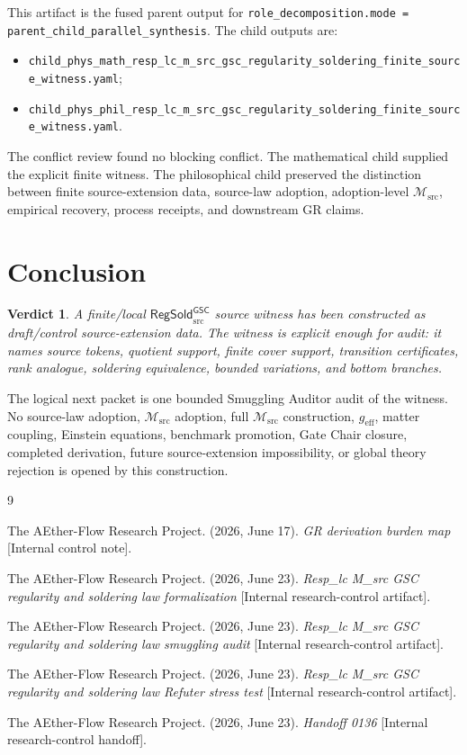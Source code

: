 \documentclass[11pt]{article}
\newcommand{\Msrc}{\mathcal{M}_{\mathrm{src}}}
\newcommand{\geff}{g_{\mathrm{eff}}}
\newcommand{\RegSold}{\mathsf{RegSold}_{\mathrm{src}}^{\mathsf{GSC}}}
\newtheorem{verdict}{Verdict}
\begin{document}
This artifact is the fused parent output for
\texttt{role\_decomposition.mode = parent\_child\_parallel\_synthesis}. The
child outputs are:
\begin{itemize}
  \item \texttt{child\_phys\_math\_resp\_lc\_m\_src\_gsc\_regularity\_soldering\_finite\_source\_witness.yaml};
  \item \texttt{child\_phys\_phil\_resp\_lc\_m\_src\_gsc\_regularity\_soldering\_finite\_source\_witness.yaml}.
\end{itemize}
The conflict review found no blocking conflict. The mathematical child
supplied the explicit finite witness. The philosophical child preserved the
distinction between finite source-extension data, source-law adoption,
adoption-level \(\Msrc\), empirical recovery, process receipts, and downstream
GR claims.

\section{Conclusion}

\begin{verdict}
A finite/local \(\RegSold\) source witness has been constructed as
draft/control source-extension data. The witness is explicit enough for audit:
it names source tokens, quotient support, finite cover support, transition
certificates, rank analogue, soldering equivalence, bounded variations, and
bottom branches.
\end{verdict}

The logical next packet is one bounded Smuggling Auditor audit of the witness.
No source-law adoption, \(\Msrc\) adoption, full \(\Msrc\) construction,
\(\geff\), matter coupling, Einstein equations, benchmark promotion, Gate
Chair closure, completed derivation, future source-extension impossibility, or
global theory rejection is opened by this construction.

\begin{thebibliography}{9}

The AEther-Flow Research Project. (2026, June 17). \emph{GR derivation
burden map} [Internal control note].

The AEther-Flow Research Project. (2026, June 23). \emph{Resp\_lc M\_src
GSC regularity and soldering law formalization}
[Internal research-control artifact].

The AEther-Flow Research Project. (2026, June 23). \emph{Resp\_lc M\_src
GSC regularity and soldering law smuggling audit}
[Internal research-control artifact].

The AEther-Flow Research Project. (2026, June 23). \emph{Resp\_lc M\_src
GSC regularity and soldering law Refuter stress test}
[Internal research-control artifact].

The AEther-Flow Research Project. (2026, June 23). \emph{Handoff 0136}
[Internal research-control handoff].

\end{thebibliography}
\end{document}
